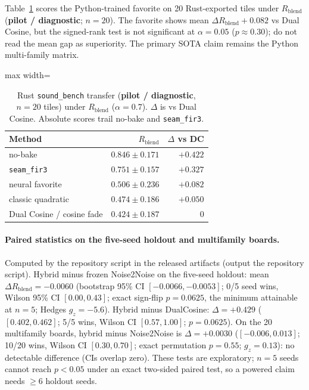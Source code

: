 Table~\ref{tab:rust-bench} scores the Python-trained favorite on 20 Rust-exported tiles under $R_{\mathrm{blend}}$ (\textbf{pilot / diagnostic}; $n{=}20$).
The favorite shows mean $\Delta R_{\mathrm{blend}}{+}0.082$ vs Dual Cosine, but the signed-rank test is not significant at $\alpha{=}0.05$ ($p{\approx}0.30$); do not read the mean gap as superiority.
The primary SOTA claim remains the Python multi-family matrix.

\begin{table}[t]
  \centering
  \caption{Rust \texttt{sound\_bench} transfer (\textbf{pilot / diagnostic}, $n{=}20$ tiles) under $R_{\mathrm{blend}}$ ($\alpha{=}0.7$).
  $\Delta$ is vs Dual Cosine. Absolute scores trail no-bake and \texttt{seam\_fir3}.}
  \label{tab:rust-bench}
  \setlength{\tabcolsep}{6pt}
  \begin{adjustbox}{max width=\columnwidth}
\begin{tabular}{@{}lrr@{}}
    \toprule
    Method & $R_{\mathrm{blend}}$ & $\Delta$ vs DC \\
    \midrule
    no-bake & $0.846\pm0.171$ & ${+}0.422$ \\
    \texttt{seam\_fir3} & $0.751\pm0.157$ & ${+}0.327$ \\
    neural favorite & $0.506\pm0.236$ & ${+}0.082$ \\
    classic quadratic & $0.474\pm0.186$ & ${+}0.050$ \\
    Dual Cosine / cosine fade & $0.424\pm0.187$ & $0$ \\
    \bottomrule
  \end{tabular}
\end{adjustbox}
\end{table}

\paragraph{Paired statistics on the five-seed holdout and multifamily boards.}
Computed by the repository script in the released artifacts (output the repository script).
Hybrid minus frozen Noise2Noise on the five-seed holdout: mean $\Delta R_{\mathrm{blend}}={-}0.0060$ (bootstrap 95\% CI $[{-}0.0066,{-}0.0053]$; 0/5 seed wins, Wilson 95\% CI $[0.00,0.43]$; exact sign-flip $p=0.0625$, the minimum attainable at $n{=}5$; Hedges $g_z={-}5.6$).
Hybrid minus DualCosine: $\Delta={+}0.429$ ($[0.402,0.462]$; 5/5 wins, Wilson CI $[0.57,1.00]$; $p=0.0625$).
On the 20 multifamily boards, hybrid minus Noise2Noise is $\Delta={+}0.0030$ ($[{-}0.006,0.013]$; 10/20 wins, Wilson CI $[0.30,0.70]$; exact permutation $p=0.55$; $g_z=0.13$): no detectable difference (CIs overlap zero).
These tests are exploratory; $n{=}5$ seeds cannot reach $p<0.05$ under an exact two-sided paired test, so a powered claim needs $\ge 6$ holdout seeds.

